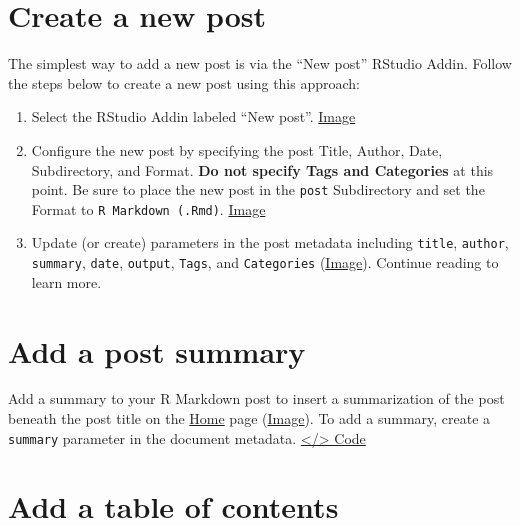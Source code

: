 \documentclass[
]{book}
\begin{document}
\hypertarget{create-a-new-post}{%
\section{Create a new post}\label{create-a-new-post}}

The simplest way to add a new post is via the ``New post'' RStudio Addin. Follow the steps below to create a new post using this approach:

\begin{enumerate}
\def\labelenumi{\arabic{enumi}.}
\item
  Select the RStudio Addin labeled ``New post''. \href{https://i.imgur.com/S9dl4DZ.png}{Image}
\item
  Configure the new post by specifying the post Title, Author, Date, Subdirectory, and Format. \textbf{Do not specify Tags and Categories} at this point. Be sure to place the new post in the \texttt{post} Subdirectory and set the Format to \texttt{R\ Markdown\ (.Rmd)}. \href{https://i.imgur.com/ciCv6yC.png}{Image}
\item
  Update (or create) parameters in the post metadata including \texttt{title}, \texttt{author}, \texttt{summary}, \texttt{date}, \texttt{output}, \texttt{Tags}, and \texttt{Categories} (\href{https://github.com/dannymorris/r4sites-anatole-custom/blob/master/content/english/post/2021-04-30-sample-post-using-python-in-r-markdown/index.en.Rmd\#L1-L18}{Image}). Continue reading to learn more.
\end{enumerate}

\hypertarget{add-a-post-summary}{%
\section{Add a post summary}\label{add-a-post-summary}}

Add a summary to your R Markdown post to insert a summarization of the post beneath the post title on the \href{https://r4sites-anatole-custom.netlify.app/}{Home} page (\href{https://i.imgur.com/SjZ24e1.png}{Image}). To add a summary, create a \texttt{summary} parameter in the document metadata. \href{https://github.com/dannymorris/r4sites-anatole-custom/blob/master/content/english/post/2021-04-30-sample-post-using-python-in-r-markdown/index.en.Rmd\#L3}{\textless/\textgreater{} Code}

\hypertarget{add-a-table-of-contents}{%
\section{Add a table of contents}\label{add-a-table-of-contents}}
\end{document}
